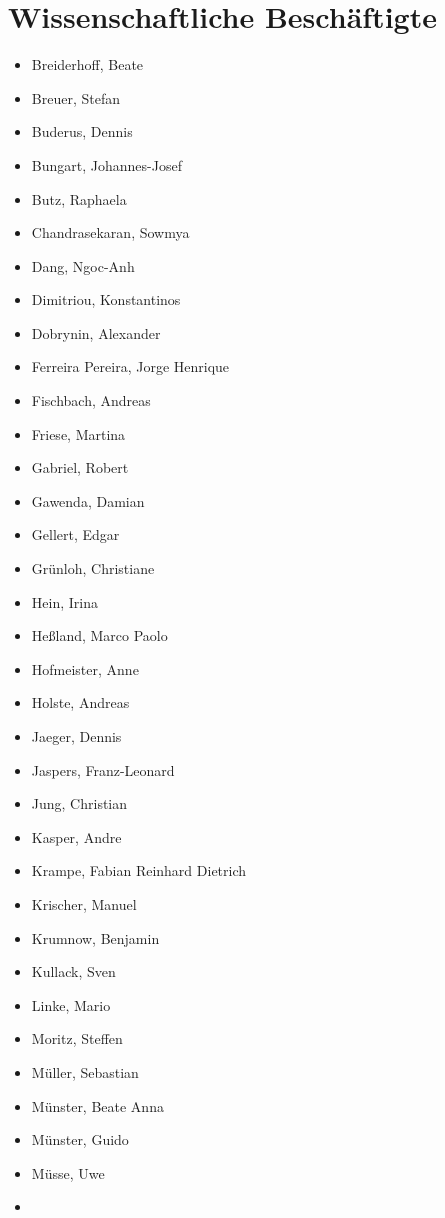 \section{Wissenschaftliche
Beschäftigte}\label{wissenschaftliche-beschuxe4ftigte}

\begin{itemize}
\tightlist
\item
  Breiderhoff, Beate
\item
  Breuer, Stefan
\item
  Buderus, Dennis
\item
  Bungart, Johannes-Josef
\item
  Butz, Raphaela
\item
  Chandrasekaran, Sowmya
\item
  Dang, Ngoc-Anh
\item
  Dimitriou, Konstantinos
\item
  Dobrynin, Alexander
\item
  Ferreira Pereira, Jorge Henrique
\item
  Fischbach, Andreas
\item
  Friese, Martina
\item
  Gabriel, Robert
\item
  Gawenda, Damian
\item
  Gellert, Edgar
\item
  Grünloh, Christiane
\item
  Hein, Irina
\item
  Heßland, Marco Paolo
\item
  Hofmeister, Anne
\item
  Holste, Andreas
\item
  Jaeger, Dennis
\item
  Jaspers, Franz-Leonard
\item
  Jung, Christian
\item
  Kasper, Andre
\item
  Krampe, Fabian Reinhard Dietrich
\item
  Krischer, Manuel
\item
  Krumnow, Benjamin
\item
  Kullack, Sven
\item
  Linke, Mario
\item
  Moritz, Steffen
\item
  Müller, Sebastian
\item
  Münster, Beate Anna
\item
  Münster, Guido
\item
  Müsse, Uwe
\item

\end{itemize}
